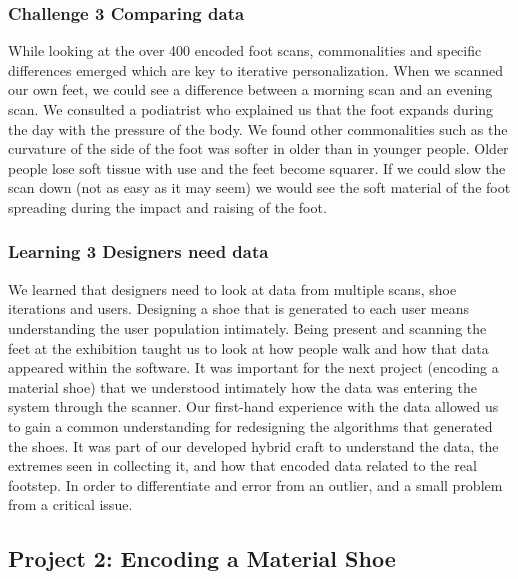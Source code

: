 \subsubsection{Challenge 3 Comparing data}

While looking at the over 400 encoded foot scans, commonalities and specific differences emerged which are key to iterative personalization. When we scanned our own feet, we could see a difference between a morning scan and an evening scan. We consulted a podiatrist who explained us that the foot expands during the day with the pressure of the body. We found other commonalities such as the curvature of the side of the foot was softer in older than in younger people. Older people lose soft tissue with use and the feet become squarer. If we could slow the scan down (not as easy as it may seem) we would see the soft material of the foot spreading during the impact and raising of the foot.

\subsubsection{Learning 3 Designers need data}

We learned that designers need to look at data from multiple scans, shoe iterations and users. Designing a shoe that is generated to each user means understanding the user population intimately. Being present and scanning the feet at the exhibition taught us to look at how people walk and how that data appeared within the software. It was important for the next project (encoding a material shoe) that we understood intimately how the data was entering the system through the scanner. Our first-hand experience with the data allowed us to gain a common understanding for redesigning the algorithms that generated the shoes. It was part of our developed hybrid craft to understand the data, the extremes seen in collecting it, and how that encoded data related to the real footstep. In order to differentiate and error from an outlier, and a small problem from a critical issue. 

\subsection{Project 2: Encoding a Material Shoe}

